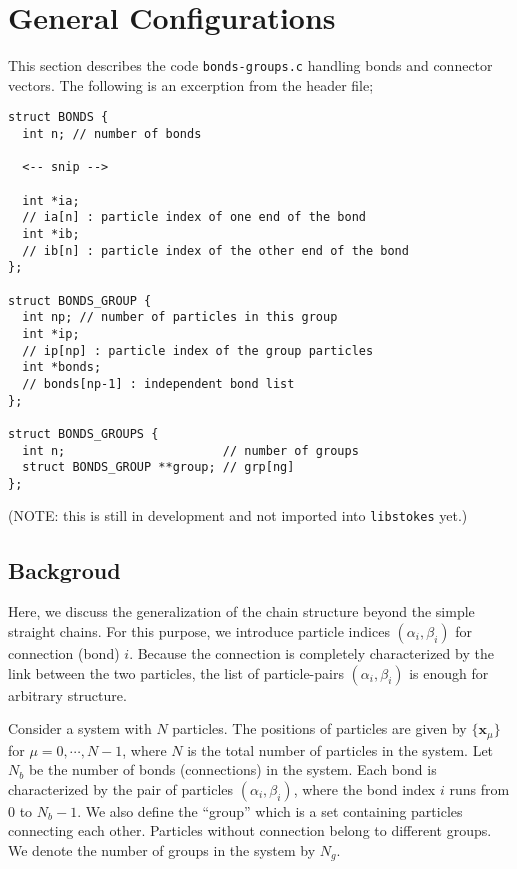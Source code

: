 
\section{General Configurations}
\label{sec:ref-bonds-groups-general-configurations}
This section describes the code {\tt bonds-groups.c} 
handling bonds and connector vectors. 
The following is an excerption from the header file; 
{\footnotesize
\begin{verbatim}
struct BONDS {
  int n; // number of bonds

  <-- snip -->

  int *ia;
  // ia[n] : particle index of one end of the bond
  int *ib;
  // ib[n] : particle index of the other end of the bond
};

struct BONDS_GROUP {
  int np; // number of particles in this group
  int *ip;
  // ip[np] : particle index of the group particles
  int *bonds;
  // bonds[np-1] : independent bond list
};

struct BONDS_GROUPS {
  int n;                      // number of groups
  struct BONDS_GROUP **group; // grp[ng]
};
\end{verbatim}
}
(NOTE: this is still in development 
and not imported into {\tt libstokes} yet.)



\subsection{Backgroud}
Here, we discuss the generalization of the chain structure 
beyond the simple straight chains. 
For this purpose, we introduce particle indices 
$(\alpha_{i}, \beta_{i})$ for connection (bond) $i$. 
Because the connection is completely characterized 
by the link between the two particles, 
the list of particle-pairs $(\alpha_{i}, \beta_{i})$ 
is enough for arbitrary structure. 

Consider a system with $N$ particles. 
The positions of particles are given by 
$\{\bm{x}_{\mu}\}$ for $\mu = 0, \cdots, N-1$, 
where $N$ is the total number of particles in the system. 
Let $N_{b}$ be the number of bonds (connections) in the system. 
Each bond is characterized by the pair of particles $(\alpha_{i}, \beta_{i})$, 
where the bond index $i$ runs from $0$ to $N_{b}-1$. 
We also define the ``group'' 
which is a set containing particles connecting each other. 
Particles without connection belong to different groups. 
We denote the number of groups in the system by $N_{g}$. 


